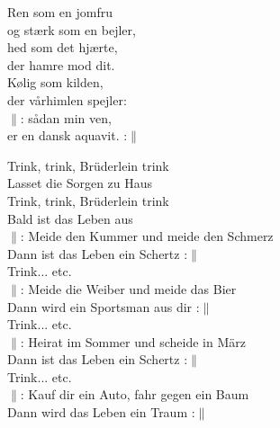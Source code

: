 \documentclass[a6paper, 10pt, twoside]{article}
\begin{document}
\noindent
\begin{center}
\end{center}
\begin{lyrics}
Ren som en jomfru\\
og stærk som en bejler,\\
hed som det hjærte,\\
der hamre mod dit.
\vspace{5pt}\\
Kølig som kilden,\\
der vårhimlen spejler:\\
$\|$: sådan min ven,\\
er en dansk aquavit. :$\|$ 
\end{lyrics}
\begin{center}
\end{center}
\begin{lyrics}
Trink, trink, Brüderlein trink\\
Lasset die Sorgen zu Haus\\
Trink, trink, Brüderlein trink\\
Bald ist das Leben aus
\vspace{5pt}\\
$\|$: Meide den Kummer und meide den Schmerz\\
Dann ist das Leben ein Schertz :$\|$
\vspace{5pt}\\
Trink... etc.
\vspace{5pt}\\
$\|$: Meide die Weiber und meide das Bier\\
Dann wird ein Sportsman aus dir :$\|$
\vspace{5pt}\\
Trink... etc.
\vspace{5pt}\\
$\|$: Heirat im Sommer und scheide in März\\
Dann ist das Leben ein Schertz :$\|$
\vspace{5pt}\\
Trink... etc.
\vspace{5pt}\\
$\|$: Kauf dir ein Auto, fahr gegen ein Baum\\
Dann wird das Leben ein Traum :$\|$
\end{lyrics}
\noindent
\end{document}
